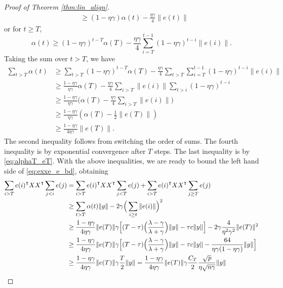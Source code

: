 \begin{proof}[Proof of Theorem \ref{thm:lin_align}]
\begin{equation*}
\begin{aligned}
    &\geq (1-\eta\gamma)\alpha(t) - \frac{\eta\gamma}{4}\|e(t)\|
\end{aligned}
\end{equation*}
or for $t\geq T$,
\begin{equation}
    \alpha(t) \geq (1-\eta\gamma)^{t-T}\alpha(T) - \frac{\eta\gamma}{4}\sum_{i=T}^{t-1}(1-\eta\gamma)^{t-i}\|e(i)\|.
\end{equation}
Taking the sum over $t>T$, we have
\begin{equation}
\label{eq:sum_alphat}
\begin{aligned}
    \sum_{t>T}\alpha(t)
    &\geq \sum_{t>T}(1-\eta\gamma)^{t-T}\alpha(T) - \frac{\eta\gamma}{4}\sum_{t>T}\sum_{i=T}^{t-1}(1-\eta\gamma)^{t-i}\|e(i)\|  \\
    &\geq \frac{1-\eta\gamma}{\eta\gamma}\alpha(T) - \frac{\eta\gamma}{4}\sum_{i>T}\|e(i)\|\sum_{t>i}(1-\eta\gamma)^{t-i} \\
    &\geq \frac{1-\eta\gamma}{\eta\gamma} \Big(\alpha(T)-\frac{\eta\gamma}{4}\sum_{i>T}\|e(i)\|\Big) \\
    &\geq \frac{1-\eta\gamma}{\eta\gamma}(\alpha(T)-\frac{1}{2}\|e(T)\|) \\
    &\geq \frac{1-\eta\gamma}{4\eta\gamma}\|e(T)\|.
\end{aligned}
\end{equation}
The second inequality follows from switching the order of sums. The fourth inequality is by exponential convergence after $T$ steps. The last inequality is by \eqref{eq:alphaT_eT}. With the above inequalities, we are ready to bound the left hand side of \eqref{eq:exxe_e_bd}, obtaining
\begin{equation}
\label{eq:lhs_bound}
\begin{aligned}
    \sum_{i>T}e(i)\transpose XX\transpose \sum_{j<i}e(j)
    &=\sum_{i>T}e(i)\transpose XX\transpose \sum_{j<T}e(j) +\sum_{i>T}e(i)\transpose XX\transpose \sum_{j\geq T}e(j) \\
    &\geq \sum_{t>T}\alpha(t)\|g\|-2\gamma \Big(\sum_{i\geq t}\|e(i)\|\Big)^2 \\
    &\geq \frac{1-\eta\gamma}{4\eta\gamma}\|e(T)\|\gamma\Big[(T-\tau)\Big(\frac{\lambda-\gamma}{\lambda+\gamma}\Big)\|y\| - \tau c\|y\|\Big] - 2\gamma\frac{4}{\eta^2\gamma^2}\|e(T)\|^2\\
    &\geq \frac{1-\eta\gamma}{4\eta\gamma}\|e(T)\|\gamma\Big[(T-\tau)\Big(\frac{\lambda-\gamma}{\lambda+\gamma}\Big)\|y\| - \tau c\|y\| - \frac{64}{\eta\gamma(1-\eta\gamma)}\|y\|\Big] \\
    &\geq \frac{1-\eta\gamma}{4\eta\gamma}\|e(T)\|\gamma\frac{T}{2}\|y\|  = \frac{1-\eta\gamma}{4\eta\gamma} \|e(T)\|\gamma \frac{C_T}{2}\frac{\sqrt p}{\eta\sqrt{n\gamma}}\|y\|\\

\end{aligned}
\end{equation}
\end{proof}
